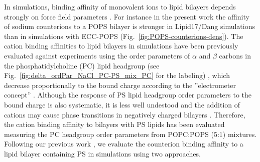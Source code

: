 \documentclass[journal=jpcbfk,manuscript=article]{achemso}
\begin{document}
In simulations, binding affinity of monovalent ions to lipid bilayers depends strongly on
force field parameters \cite{catte16,NMRlipidsIV}.
For instance in the present work the affinity of sodium counterions to a POPS bilayer 
is stronger in Lipid17/Dang simulations 
than in simulations with ECC-POPS (Fig.~\ref{fig:POPS-counterions-dens}).
The cation binding affinities to lipid bilayers in simulations have been previously evaluated
against experiments using the order parameters of $\alpha$ and $\beta$ carbons in the
phosphatidylcholine (PC) lipid headgroup (see Fig.~\ref{fig:delta_ordPar_NaCl_PC-PS_mix_PC} for the labeling) \cite{catte16,melcr18,NMRlipidsIV},
which decrease proportionally to the bound charge according to the ''electrometer concept'' \citep{seelig87}.
Although the response of PS lipid headgroup order parameters to the bound charge is also systematic,
it is less well undestood and the addition of cations may cause phase transitions in negatively charged
bilayers \cite{feigenson86,mattai89,roux91,roux90}. Therefore, the cation binding affinity to bilayers with
PS lipids has been evaluated measuring the PC headgroup order parameters from POPC:POPS (5:1)
mixtures\cite{roux90,NMRlipidsIV}.
Following our previous work \cite{NMRlipidsIV}, we evaluate the counterion binding affinity
to a lipid bilayer containing PS in simulations using two approaches.

 
\end{document}
